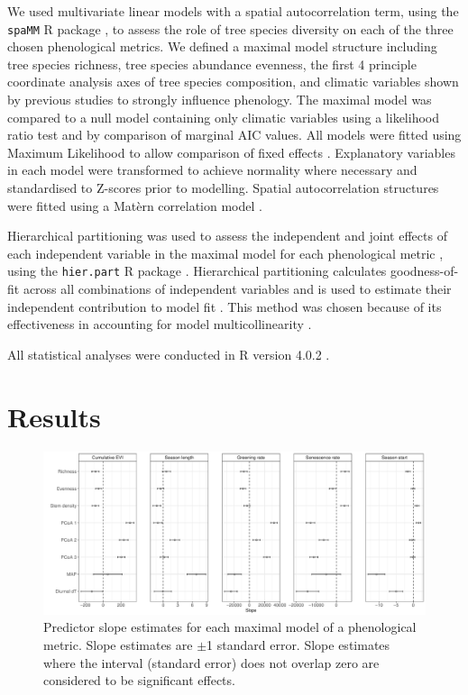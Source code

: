 \documentclass[11pt,a4paper]{article}
\begin{document}
We used multivariate linear models with a spatial autocorrelation term, using the \texttt{spaMM} R package \citep{spaMM2014}, to assess the role of tree species diversity on each of the three chosen phenological metrics. We defined a maximal model structure including tree species richness, tree species abundance evenness, the first 4 principle coordinate analysis axes of tree species composition, and climatic variables shown by previous studies to strongly influence phenology. The maximal model was compared to a null model containing only climatic variables using a likelihood ratio test and by comparison of marginal AIC values. All models were fitted using Maximum Likelihood to allow comparison of fixed effects \citep{}. Explanatory variables in each model were transformed to achieve normality where necessary and standardised to Z-scores prior to modelling. Spatial autocorrelation structures were fitted using a Mat\`{e}rn correlation model \citep{}.

Hierarchical partitioning was used to assess the independent and joint effects of each independent variable in the maximal model for each phenological metric \citep{Chevan1991, MacNally2002}, using the \texttt{hier.part} R package \citep{hier.part2004}. Hierarchical partitioning calculates goodness-of-fit across all combinations of independent variables \citep{Walsh2013} and is used to estimate their independent contribution to model fit \citep{MacNally2002}. This method was chosen because of its effectiveness in accounting for model multicollinearity \citep{Olea2010}. 

All statistical analyses were conducted in R version 4.0.2 \citep{R2020}.

\section{Results}



 

\begin{figure}[H]
\centering
	\includegraphics[width=\textwidth]{mod_spamm_slopes.pdf}
	\caption{Predictor slope estimates for each maximal model of a phenological metric. Slope estimates are $\pm$1 standard error. Slope estimates where the interval (standard error) does not overlap zero are considered to be significant effects.}
	\label{mod_spamm_slopes}
\end{figure}
\end{document}
